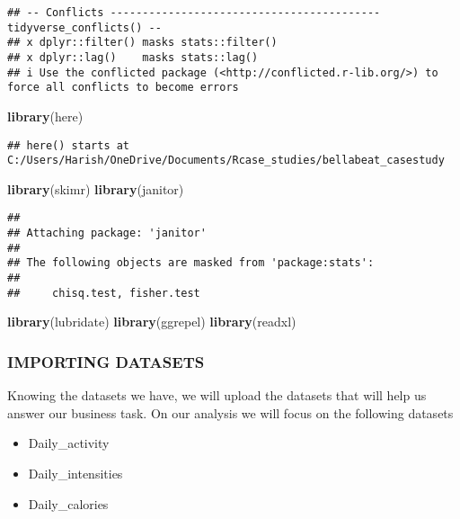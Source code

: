 \documentclass[
]{article}
\newenvironment{Shaded}{\begin{snugshade}}{\end{snugshade}}
\newcommand{\FunctionTok}[1]{\textcolor[rgb]{0.13,0.29,0.53}{\textbf{#1}}}
\newcommand{\NormalTok}[1]{#1}
\providecommand{\tightlist}{%
  \setlength{\itemsep}{0pt}\setlength{\parskip}{0pt}}
\begin{document}
\begin{verbatim}
## -- Conflicts ------------------------------------------ tidyverse_conflicts() --
## x dplyr::filter() masks stats::filter()
## x dplyr::lag()    masks stats::lag()
## i Use the conflicted package (<http://conflicted.r-lib.org/>) to force all conflicts to become errors
\end{verbatim}

\begin{Shaded}
\begin{Highlighting}[]
\FunctionTok{library}\NormalTok{(here)}
\end{Highlighting}
\end{Shaded}

\begin{verbatim}
## here() starts at C:/Users/Harish/OneDrive/Documents/Rcase_studies/bellabeat_casestudy
\end{verbatim}

\begin{Shaded}
\begin{Highlighting}[]
\FunctionTok{library}\NormalTok{(skimr)}
\FunctionTok{library}\NormalTok{(janitor)}
\end{Highlighting}
\end{Shaded}

\begin{verbatim}
## 
## Attaching package: 'janitor'
## 
## The following objects are masked from 'package:stats':
## 
##     chisq.test, fisher.test
\end{verbatim}

\begin{Shaded}
\begin{Highlighting}[]
\FunctionTok{library}\NormalTok{(lubridate)}
\FunctionTok{library}\NormalTok{(ggrepel)}
\FunctionTok{library}\NormalTok{(readxl)}
\end{Highlighting}
\end{Shaded}

\hypertarget{importing-datasets}{%
\subsubsection{IMPORTING DATASETS}\label{importing-datasets}}

Knowing the datasets we have, we will upload the datasets that will help
us answer our business task. On our analysis we will focus on the
following datasets

\begin{itemize}
\tightlist
\item
  Daily\_activity
\item
  Daily\_intensities
\item
  Daily\_calories
\end{itemize}
\end{document}

